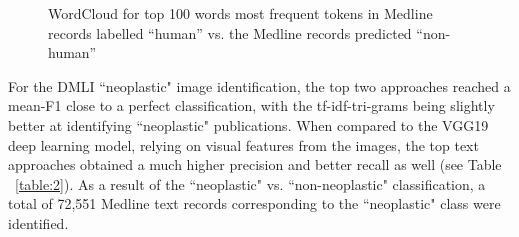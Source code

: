 \documentclass[]{spie}  %
\begin{document}
\vspace{5mm}
%
\begin{figure}%
    \centering
    \caption{WordCloud for top 100 words most frequent tokens in Medline records labelled ``human'' vs. the Medline records predicted ``non-human''}%
    \label{fig:wordcloud_human}
\end{figure}
\vspace{5mm}
%
For the DMLI ``neoplastic" image identification, the top two approaches reached a mean-F1 close to a perfect classification, with the tf-idf-tri-grams being slightly better at identifying ``neoplastic" publications.
When compared to the VGG19 deep learning model, relying on visual features from the images, the top text approaches obtained a much higher precision and better recall as well (see Table ~\ref{table:2}). 
As a result of the ``neoplastic" vs. ``non-neoplastic" classification, a total of 72,551 Medline text records corresponding to the ``neoplastic" class were identified.
\vspace{5mm}
\end{document}
